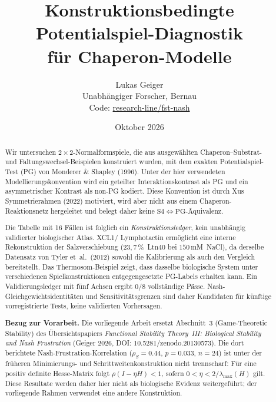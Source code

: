 \documentclass[12pt,a4paper]{article}
\title{Konstruktionsbedingte Potentialspiel-Diagnostik\\
für Chaperon-Modelle}
\author{Lukas Geiger\\
\small Unabhängiger Forscher, Bernau\\
\small Code: \href{https://github.com/research-line/fst-nash}{research-line/fst-nash}}
\date{Oktober 2026}
\begin{document}
\maketitle

\begin{abstract}
Wir untersuchen $2\times 2$-Normalformspiele, die aus ausgewählten
Chaperon--Substrat- und Faltungswechsel-Beispielen konstruiert wurden,
mit dem exakten Potentialspiel-Test (PG) von Monderer \& Shapley (1996).
Unter der hier verwendeten Modellierungskonvention wird ein geteilter
Interaktionskontrast als PG und ein asymmetrischer Kontrast als non-PG
kodiert. Diese Konvention ist durch Xus Symmetrierahmen (2022)
motiviert, wird aber nicht aus einem Chaperon-Reaktionsnetz hergeleitet
und belegt daher keine $\mathrm{S4}\iff\mathrm{PG}$-Äquivalenz.

Die Tabelle mit 16 Fällen ist folglich ein \emph{Konstruktionsledger},
kein unabhängig validierter biologischer Atlas. XCL1/\allowbreak
Lymphotactin ermöglicht eine interne Rekonstruktion der Salzverschiebung
($23{,}7\,\%$~Ltn40 bei $150$\,mM~NaCl), da derselbe Datensatz von Tyler et~al.\ (2012)
sowohl die Kalibrierung als auch den Vergleich bereitstellt. Das Thermosom-Beispiel
zeigt, dass dasselbe biologische System unter verschiedenen
Spielkonstruktionen entgegengesetzte PG-Labels erhalten kann. Ein
Validierungsledger mit fünf Achsen ergibt $0/8$ vollständige Pässe.
Nash-Gleichgewichtsidentitäten und Sensitivitätsgrenzen sind daher
Kandidaten für künftige vorregistrierte Tests, keine validierten
Vorhersagen.

\medskip\noindent
\textbf{Bezug zur Vorarbeit.}
Die vorliegende Arbeit ersetzt Abschnitt~3 (\glqq Game-Theoretic Stability\grqq{}) des
Übersichtspapiers \emph{Functional Stability Theory~III: Biological
Stability and Nash Frustration} (Geiger 2026, DOI:
10.5281/zenodo.20130573). Die dort berichtete Nash-Frustration-Korrelation
($\rho_S = 0.44$, $p = 0.033$, $n = 24$) ist unter der früheren
Minimierungs- und Schrittweitenkonstruktion nicht trennscharf: Für
eine positiv definite Hesse-Matrix folgt $\rho(I-\eta H)<1$, sofern
$0<\eta<2/\lambda_{\max}(H)$ gilt. Diese Resultate werden daher hier
nicht als biologische Evidenz weitergeführt; der vorliegende Rahmen
verwendet eine andere Konstruktion.
\end{abstract}

\clearpage
\begingroup
\small
\setlength{\parskip}{0pt}
\tableofcontents
\endgroup
\clearpage
\end{document}
